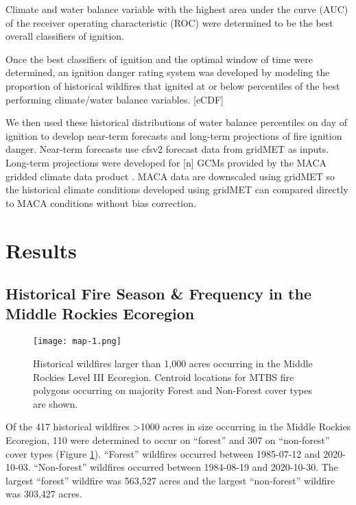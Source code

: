 \documentclass{article}
\begin{document}
Climate and water balance variable with the highest area under the curve (AUC) of the receiver operating characteristic (ROC) were determined to be the best overall classifiers of ignition.  

Once the best classifiers of ignition and the optimal window of time were determined, an ignition danger rating system was developed by modeling the proportion of historical wildfires that ignited at or below percentiles of the best performing climate/water balance variables. [eCDF]

We then used these historical distributions of water balance percentiles on day of ignition to develop near-term forecasts and long-term projections of fire ignition danger.  Near-term forecasts use cfsv2 forecast data from gridMET as inputs.  Long-term projections were developed for [n] GCMs provided by the MACA gridded climate data product \citep{abatzoglouComparisonStatisticalDownscaling2012}.  MACA data are downscaled using gridMET so the historical climate conditions developed using gridMET can compared directly to MACA conditions without bias correction.

\section{Results}

\subsection{Historical Fire Season \& Frequency in the Middle Rockies Ecoregion}

\begin{figure}[ht]
  \texttt{[image: map-1.png]}
  \caption{Historical wildfires larger than 1,000 acres occurring in the Middle Rockies Level III Ecoregion.  Centroid locations for MTBS fire polygons occurring on majority Forest and Non-Forest cover types are shown.}
  \label{fig:map}
\end{figure}

Of the 417 historical wildfires \textgreater1000 acres in size occurring in the Middle Rockies Ecoregion, 110 were determined to occur on ``forest'' and 307 on ``non-forest'' cover types (Figure \ref{fig:map}).  ``Forest'' wildfires occurred between 1985-07-12 and 2020-10-03.  ``Non-forest'' wildfires occurred between 1984-08-19 and 2020-10-30.  The largest ``forest'' wildfire was 563,527 acres and the largest ``non-forest'' wildfire was 303,427 acres.
\end{document}
